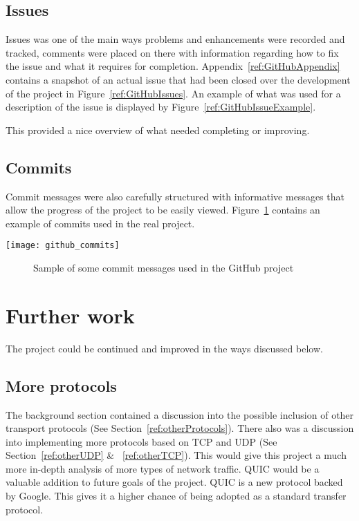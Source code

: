 \subsection{Issues}
Issues was one of the main ways problems and enhancements were recorded and tracked, comments were placed on there with information regarding how to fix the issue and what it requires for completion. Appendix~\ref{ref:GitHubAppendix} contains a snapshot of an actual issue that had been closed over the development of the project in Figure~\ref{ref:GitHubIssues}. An example of what was used for a description of the issue is displayed by Figure~\ref{ref:GitHubIssueExample}.

This provided a nice overview of what needed completing or improving.

\subsection{Commits}
Commit messages were also carefully structured with informative messages that allow the progress of the project to be easily viewed. Figure~\ref{ref:githubCommits} contains an example of commits used in the real project.

\begin{center}
	\texttt{[image: github\_commits]}
	\begin{figure}[h]
		\caption{Sample of some commit messages used in the GitHub project}
		\label{ref:githubCommits}
	\end{figure}
\end{center}

\section{Further work}
The project could be continued and improved in the ways discussed below.

\subsection{More protocols}
The background section contained a discussion into the possible inclusion of other transport protocols 
(See Section~\ref{ref:otherProtocols}). There also was a discussion into implementing more protocols based on TCP and UDP (See Section~\ref{ref:otherUDP} \& ~\ref{ref:otherTCP}). This would give this project a much more in-depth analysis of more types of network traffic. QUIC would be a valuable addition to future goals of the project. QUIC is a new protocol backed by Google. This gives it a higher chance of being adopted as a standard transfer protocol.

